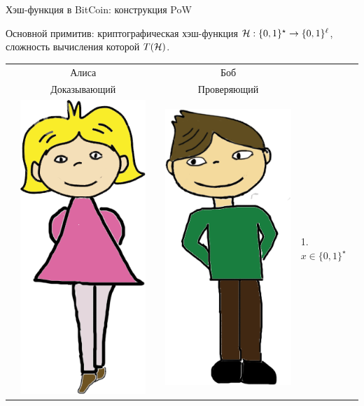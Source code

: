 \documentclass[usenames,dvipsnames,8pt,aspectratio=169]{beamer}
\begin{document}
\begin{frame}{Хэш-функция в  BitCoin: конструкция PoW}

\large
Основной примитив: криптографическая хэш-функция  $\mathcal{H}:\{0,1\}^\star \rightarrow \{0,1\}^\ell$, сложность вычисления которой $T(\mathcal{H})$.

\vspace{10pt}
\begin{tabular}{l c c c l}
& Алиса  & & Боб &  \\
& Доказывающий  & & Проверяющий &  \\[3pt]
& \multirow{5}{*}{\includegraphics[scale=0.15]{Alice}} & & 
\multirow{5}{*}{\includegraphics[scale=0.15]{Bob}} &  1. $x \in \{0,1\}^{\star}$   \\

\end{tabular}
\end{frame}
\end{document}
